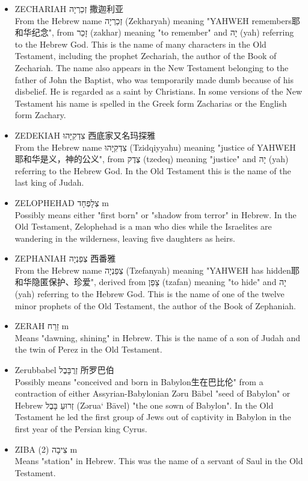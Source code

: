 \begin{itemize}
\item ZECHARIAH זְכַרְיָה 撒迦利亚 \\
From the Hebrew name זְכַרְיָה (Zekharyah) meaning "YAHWEH remembers耶和华纪念", from זָכַר (zakhar) meaning "to remember" and יָה (yah) referring to the Hebrew God. This is the name of many characters in the Old Testament, including the prophet Zechariah, the author of the Book of Zechariah. The name also appears in the New Testament belonging to the father of John the Baptist, who was temporarily made dumb because of his disbelief. He is regarded as a saint by Christians. In some versions of the New Testament his name is spelled in the Greek form Zacharias or the English form Zachary. 
\item ZEDEKIAH צִדְקִיָּהוּ 西底家又名玛探雅 \\
From the Hebrew name צִדְקִיָּהוּ (Tzidqiyyahu) meaning "justice of YAHWEH耶和华是义，神的公义", from צֶדֶק (tzedeq) meaning "justice" and יָה (yah) referring to the Hebrew God. In the Old Testament this is the name of the last king of Judah.
\item ZELOPHEHAD צְלָפְחָד m \\
Possibly means either "first born" or "shadow from terror" in Hebrew. In the Old Testament, Zelophehad is a man who dies while the Israelites are wandering in the wilderness, leaving five daughters as heirs.
\item ZEPHANIAH צְפַנְיָה 西番雅 \\
From the Hebrew name צְפַנְיָה (Tzefanyah) meaning "YAHWEH has hidden耶和华隐匿保护、珍爱", derived from צָפַן (tzafan) meaning "to hide" and יָה (yah) referring to the Hebrew God. This is the name of one of the twelve minor prophets of the Old Testament, the author of the Book of Zephaniah.
\item ZERAH זֵרַח m \\
Means "dawning, shining" in Hebrew. This is the name of a son of Judah and the twin of Perez in the Old Testament.
\item Zerubbabel זְרֻבָּבֶל 所罗巴伯 \\
Possibly means "conceived and born in Babylon生在巴比伦" from a contraction of either Assyrian-Babylonian Zəru Bābel "seed of Babylon" or Hebrew זְרוּעַ בָּבֶל (Zərua‘ Bāvel) "the one sown of Babylon". In the Old Testament he led the first group of Jews out of captivity in Babylon in the first year of the Persian king Cyrus.
\item ZIBA (2) צִיבָה m\\
Means "station" in Hebrew. This was the name of a servant of Saul in the Old Testament.

\end{itemize}
